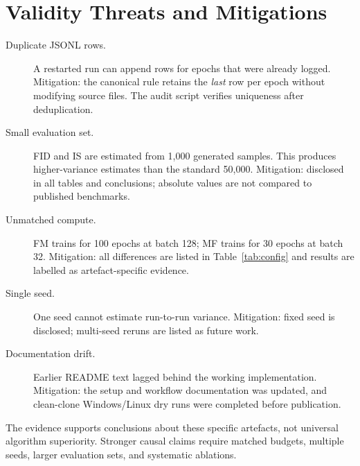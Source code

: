 \section{Validity Threats and Mitigations}

\begin{description}
  \item[Duplicate JSONL rows.] A restarted run can append rows for epochs that
    were already logged. Mitigation: the canonical rule retains the \emph{last} row per epoch
    without modifying source files. The audit script verifies uniqueness after
    deduplication.
  \item[Small evaluation set.] FID and IS are estimated from 1{,}000 generated
    samples. This produces higher-variance estimates than the standard 50{,}000.
    Mitigation: disclosed in all tables and conclusions; absolute values are not
    compared to published benchmarks.
  \item[Unmatched compute.] FM trains for 100 epochs at batch 128; MF trains for
    30 epochs at batch 32. Mitigation: all differences are listed in Table~\ref{tab:config}
    and results are labelled as artefact-specific evidence.
  \item[Single seed.] One seed cannot estimate run-to-run variance.
    Mitigation: fixed seed is disclosed; multi-seed reruns are listed as future work.
  \item[Documentation drift.] Earlier README text lagged behind the working
    implementation. Mitigation: the setup and workflow documentation was updated,
    and clean-clone Windows/Linux dry runs were completed before publication.
\end{description}

The evidence supports conclusions about these specific artefacts, not universal
algorithm superiority. Stronger causal claims require matched budgets, multiple
seeds, larger evaluation sets, and systematic ablations.
